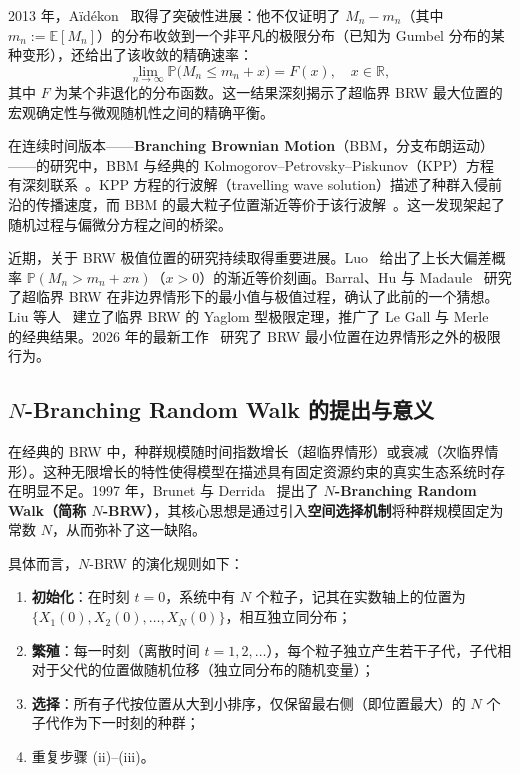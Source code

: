2013 年，Aïdékon~\cite{aidekon2013} 取得了突破性进展：他不仅证明了 $M_n - m_n$（其中 $m_n := \mathbb{E}[M_n]$）的分布收敛到一个非平凡的极限分布（已知为 Gumbel 分布的某种变形），还给出了该收敛的精确速率：
\[
\lim_{n\to\infty} \mathbb{P}\!\bigl(M_n \leqslant m_n + x\bigr) = F(x), \quad x\in\mathbb{R},
\]
其中 $F$ 为某个非退化的分布函数。这一结果深刻揭示了超临界 BRW 最大位置的宏观确定性与微观随机性之间的精确平衡。

在连续时间版本——\textbf{Branching Brownian Motion}（BBM，分支布朗运动）——的研究中，BBM 与经典的 Kolmogorov--Petrovsky--Piskunov（KPP）方程~\cite{kolmogorov1937} 有深刻联系~\cite{kesten1973speed,kesten1977contribution}。KPP 方程的行波解（travelling wave solution）描述了种群入侵前沿的传播速度，而 BBM 的最大粒子位置渐近等价于该行波解~\cite{brunet2006,brassil2020}。这一发现架起了随机过程与偏微分方程之间的桥梁。

近期，关于 BRW 极值位置的研究持续取得重要进展。Luo~\cite{luo2025} 给出了上长大偏差概率 $\mathbb{P}(M_n > m_n + xn)$（$x>0$）的渐近等价刻画。Barral、Hu 与 Madaule~\cite{barral2018} 研究了超临界 BRW 在非边界情形下的最小值与极值过程，确认了此前的一个猜想。Liu 等人~\cite{liu2025} 建立了临界 BRW 的 Yaglom 型极限定理，推广了 Le Gall 与 Merle~\cite{legall2006} 的经典结果。2026 年的最新工作~\cite{bramson2026extremal} 研究了 BRW 最小位置在边界情形之外的极限行为。

\subsection{$N$-Branching Random Walk 的提出与意义}
\label{ssec:nbrw_intro}

在经典的 BRW 中，种群规模随时间指数增长（超临界情形）或衰减（次临界情形）。这种无限增长的特性使得模型在描述具有固定资源约束的真实生态系统时存在明显不足。1997 年，Brunet 与 Derrida~\cite{brunet1997} 提出了 \textbf{$N$-Branching Random Walk（简称 $N$-BRW）}，其核心思想是通过引入\textbf{空间选择机制}将种群规模固定为常数 $N$，从而弥补了这一缺陷。

具体而言，$N$-BRW 的演化规则如下：

\begin{enumerate}
\item[(i)] \textbf{初始化}：在时刻 $t=0$，系统中有 $N$ 个粒子，记其在实数轴上的位置为 $\{X_1(0),X_2(0),\dots,X_N(0)\}$，相互独立同分布；
\item[(ii)] \textbf{繁殖}：每一时刻（离散时间 $t=1,2,\dots$），每个粒子独立产生若干子代，子代相对于父代的位置做随机位移（独立同分布的随机变量）；
\item[(iii)] \textbf{选择}：所有子代按位置从大到小排序，仅保留最右侧（即位置最大）的 $N$ 个子代作为下一时刻的种群；
\item[(iv)] 重复步骤 (ii)--(iii)。
\end{enumerate}

